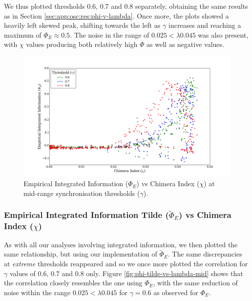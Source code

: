 \documentclass[a4paper,11pt]{article}
\begin{document}
We thus plotted thresholds 0.6, 0.7 and 0.8 separately, obtaining the same results as in Section \ref{sec:app:osc:res:phi-v-lambda}. Once more, the plots showed a heavily left skewed peak, shifting towards the left as $\gamma$ increases and reaching a maximum of $\Phi_E \approx 0.5$. The noise in the range of $0.025 < \lambda 0.045$ was also present, with $\chi$ values producing both relatively high $\Phi$ as well as negative values.

\begin{figure}[H]
\begin{center}
\includegraphics[scale = 0.35]{figures/phi_vs_chi_mid}
\caption{
	Empirical Integrated Information ($\Phi_E$) vs Chimera Index ($\chi$) at mid-range synchronisation thresholds ($\gamma$).
	\label{fig:phi-vs-chi-mid}
}
\end{center}
\end{figure}

\subsubsection{Empirical Integrated Information Tilde ($\widetilde{\Phi}_{E}$) vs Chimera Index ($\chi$)}
\label{sec:app:osc:res:phi-tilde-v-chi}

As with all our analyses involving integrated information, we then plotted the same relationship, but using our implementation of $\widetilde{\Phi}_{E}$. The same discrepancies at \textit{extreme} thresholds reappeared and so we once more plotted the correlation for $\gamma$ values of 0.6, 0.7 and 0.8 only. Figure \ref{fig:phi-tilde-vs-lambda-mid} shows that the correlation closely resembles the one using $\Phi_E$, with the same reduction of noise within the range $0.025 < \lambda 0.045$ for $\gamma = 0.6$ as observed for $\Phi_E$.
\end{document}
